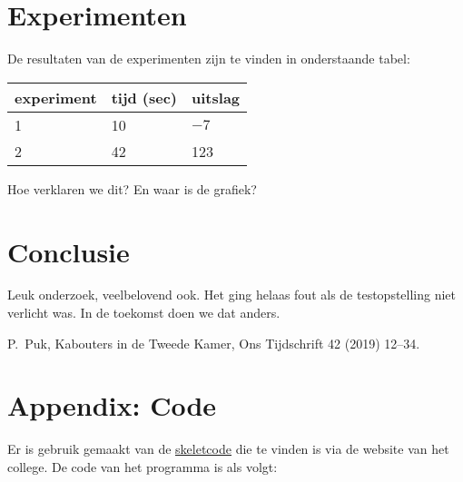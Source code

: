 \documentclass[a4paper,10pt]{article}
\begin{document}
\section{Experimenten}

De resultaten van de experimenten zijn te
vinden in onderstaande tabel:

\begin{center}
\begin{tabular}{l|l|l}
experiment & tijd (sec) & uitslag\\
\hline
1 & 10 & $-7$\\
2 & 42 & 123
\end{tabular}
\end{center}
Hoe verklaren we dit? En waar is de grafiek?

\section{Conclusie}

Leuk onderzoek, veelbelovend ook. Het ging helaas 
fout als de testopstelling niet verlicht was.
In de toekomst doen we dat anders.

\begin{thebibliography}{XX}

P.~Puk, Kabouters in de Tweede Kamer,
Ons Tijdschrift 42 (2019) 12--34.

\end{thebibliography}

\section*{Appendix: Code}

Er is gebruik gemaakt van de \href{http://www.liacs.leidenuniv.nl/~kosterswa/AI/iets.cc}{\underline{skeletcode}} die te vinden is via
de website van het college.
De code van het programma is als volgt:

\smallskip


\end{document}
